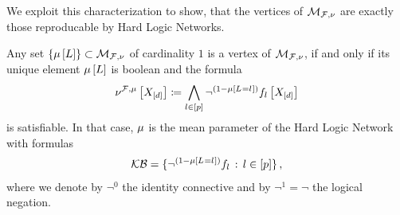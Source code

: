 



We exploit this characterization to show, that the vertices of $\mathcal{M}_{\mathcal{F},\nu}$ are exactly those reproducable by Hard Logic Networks.

\begin{theorem}\label{the:extremeCharacterizationHLN}
	Any set $\{\mu\left[L\right]\}\subset\mathcal{M}_{\mathcal{F},\nu}$ of cardinality $1$ is a vertex of $\mathcal{M}_{\mathcal{F},\nu}$, if and only if its unique element $\mu\left[L\right]$ is boolean and the formula
	\begin{align*}
		 \nu^{\mathcal{F},\mu}\left[X_{[d]}\right]
			\coloneqq \bigwedge_{l\in[p]} \lnot^{(1-\mu\left[L_{}=l_{}\right])} f_{l}\left[X_{[d]}\right]
	\end{align*}
	is satisfiable.
	In that case, $\mu$ is the mean parameter of the Hard Logic Network with formulas
	\begin{align*}
		\kb=\{\lnot^{(1-\meanparamat{\indexedselvariable})} \enumformula \, : \, \selindexin \} \, , %
	\end{align*}
	where we denote by $\lnot^0$ the identity connective and by $\lnot^1=\lnot$ the logical negation.
\end{theorem}
